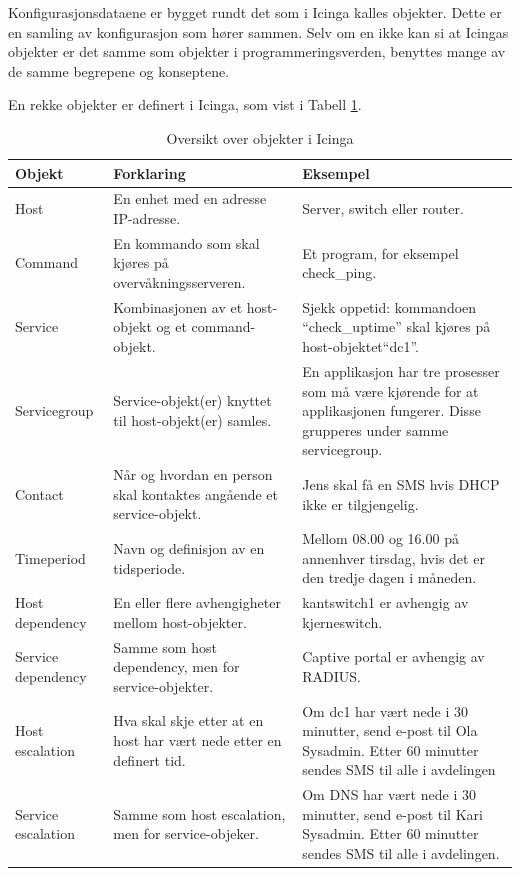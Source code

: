 Konfigurasjonsdataene er bygget rundt det som i Icinga kalles objekter. Dette er en samling av konfigurasjon som hører sammen. Selv om en ikke kan si at Icingas objekter er det samme som objekter i programmeringsverden, benyttes mange av de samme begrepene og konseptene.

En rekke objekter er definert i Icinga, som vist i Tabell \ref{objekter}.

\begin{changemargin}{-1cm}{-1cm}
\begin{table}
\begin{center}
\begin{tabular}{ | p{3.5cm} | p{6.5cm} | p{6cm} |} \hline
	\textbf{Objekt} & \textbf{Forklaring} & \textbf{Eksempel} \\ \hline
	Host & En enhet med en adresse IP-adresse. & Server, switch eller router. \\ \hline
	Command & En kommando som skal kjøres på overvåkningsserveren. & Et program, for eksempel check\_ping. \\ \hline 
	Service & Kombinasjonen av et host-objekt og et command-objekt. & Sjekk oppetid: kommandoen ``check\_uptime'' skal kjøres på host-objektet``dc1''. \\ \hline
	Servicegroup & Service-objekt(er) knyttet til host-objekt(er) samles. & En applikasjon har tre prosesser som må være kjørende for at applikasjonen fungerer. Disse grupperes under samme servicegroup. \\ \hline
	Contact & Når og hvordan en person skal kontaktes angående et service-objekt. & Jens skal få en SMS hvis DHCP ikke er tilgjengelig. \\ \hline
	Timeperiod & Navn og definisjon av en tidsperiode. & Mellom 08.00 og 16.00 på annenhver tirsdag, hvis det er den tredje dagen i måneden. \\ \hline
	Host dependency & En eller flere avhengigheter mellom host-objekter. & kantswitch1 er avhengig av kjerneswitch. \\ \hline
	Service dependency & Samme som host dependency, men for service-objekter. & Captive portal er avhengig av RADIUS. \\ \hline
	Host escalation & Hva skal skje etter at en host har vært nede etter en definert tid. &	Om dc1 har vært nede i 30 minutter, send e-post til Ola Sysadmin. Etter 60 minutter sendes SMS til alle i avdelingen \\ \hline
	Service escalation & Samme som host escalation, men for service-objeker. & Om DNS har vært nede i 30 minutter, send e-post til Kari Sysadmin. Etter 60 minutter sendes SMS til alle i avdelingen. \\ \hline
	\end{tabular}
	\caption{Oversikt over objekter i Icinga}
	\label{objekter}
\end{center}
\end{table}
\end{changemargin}


